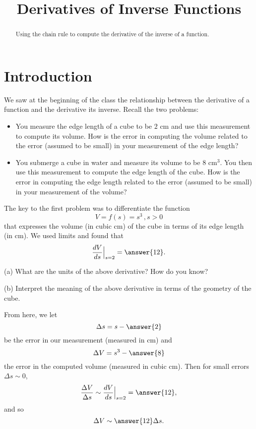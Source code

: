 \documentclass{ximera}
\title{Derivatives of Inverse Functions}
\begin{document}
\begin{abstract}
Using the chain rule to compute the derivative of the inverse of a function.
\end{abstract}
\maketitle


\section*{Introduction}
We saw at the beginning of the class the relationship between the derivative of a function and the derivative its inverse. Recall the two problems:

\begin{itemize}
\item{You measure the edge length of a cube to be $2$ cm and use this measurement to compute its volume. How is the error in computing the volume related to the error (assumed to be small) in your measurement of the edge length?}

\item{You submerge a cube in water and measure its volume to be $8 \text{ cm}^3$. You then use this measurement to compute the edge length of the cube. How is the error in computing the edge length related to the error (assumed to be small) in your measurement of the volume?}

\end{itemize}

The key to the first problem was to differentiate the function
\[
      V = f(s) = s^3 \, , s>0
\] 
that expresses the volume (in cubic cm) of the cube in terms of its edge length (in cm). We used limits and found that
\[
   \frac{dV}{ds}\Big|_{s=2} = \answer{12}.
\]

\begin{question} \label{Q34rgbds}
(a) What are the units of the above derivative? How do you know?

(b) Interpret the meaning of the above derivative in terms of the geometry of the cube.
\end{question}

From here, we let 
\[
         \Delta s = s- \answer{2}
\]
be the error in our measurement (measured in cm) and 
\[
      \Delta V = s^3 -  \answer{8}
\]
the error in the computed volume (measured in cubic cm). Then for small errors $\Delta s \sim 0$, 
\[
       \frac{\Delta V}{\Delta s} \sim  \frac{dV}{ds}\Big|_{s=2} = \answer{12} ,
\]
and so
\[
       \Delta V \sim \answer{12} \Delta s.
\]
\end{document}
